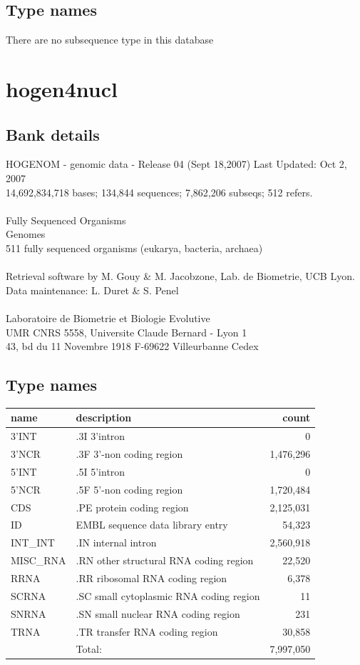 \documentclass{article}
\begin{document}
\begin{Schunk}
\subsection{Type names}
There are no subsequence type in this database
\section{ hogen4nucl }
\subsection{Bank details}
HOGENOM - genomic data - Release 04 (Sept 18,2007) Last Updated: Oct  2, 2007\\
14,692,834,718 bases; 134,844 sequences; 7,862,206 subseqs; 512 refers.\\
\\
Fully Sequenced Organisms\\
Genomes\\
511 fully sequenced organisms (eukarya, bacteria, archaea)\\
\\
Retrieval software by M. Gouy \& M. Jacobzone, Lab. de Biometrie, UCB Lyon.\\
Data maintenance: L. Duret \& S. Penel\\
\\
Laboratoire de Biometrie et Biologie Evolutive\\
UMR CNRS 5558, Universite Claude Bernard - Lyon 1\\
43, bd du 11 Novembre 1918 F-69622 Villeurbanne Cedex\\


\subsection{Type names}
\noindent\begin{tabular}{llr}
\hline \hline
name & description & count \\
\hline
3'INT  &  .3I 3'intron  &  0 \\
3'NCR  &  .3F  3'-non coding region  &  1,476,296 \\
5'INT  &  .5I 5'intron  &  0 \\
5'NCR  &  .5F  5'-non coding region  &  1,720,484 \\
CDS  &  .PE protein coding region  &  2,125,031 \\
ID  &  EMBL sequence data library entry  &  54,323 \\
INT\_INT  &  .IN  internal intron  &  2,560,918 \\
MISC\_RNA  &  .RN other structural RNA coding region  &  22,520 \\
RRNA  &  .RR ribosomal RNA coding region  &  6,378 \\
SCRNA  &  .SC small cytoplasmic RNA coding region  &  11 \\
SNRNA  &  .SN small nuclear RNA coding region  &  231 \\
TRNA  &  .TR transfer RNA coding region  &  30,858 \\
\hline
 & Total: & 7,997,050 \\
\hline \hline
\end{tabular}


\end{Schunk}
\end{document}

